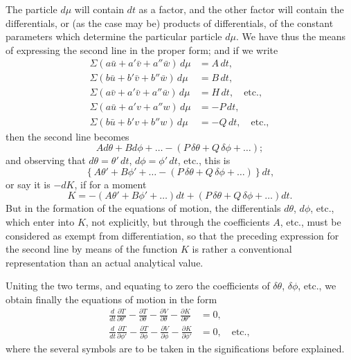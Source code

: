 \documentclass[11pt,a4paper]{book}
\begin{document}
The particle $d\mu$ will contain $dt$ as a factor, and the other factor will contain the differentials, or (as the case may be) products of differentials, of the constant parameters which determine the particular particle $d\mu$. We have thus the means of expressing the second line in the proper form; and if we write
\begin{align*}
\Sigma(a\bar{u}+a'\bar{v}+a''\bar{w})\,d\mu &= A\,dt,\\
\Sigma(b\bar{u}+b'\bar{v}+b''\bar{w})\,d\mu &= B\,dt,\\
\Sigma(a\bar{v}+a'\bar{v}+a''\bar{w})\,d\mu &= H\,dt,\quad \text{etc.},\\
\Sigma(a\bar{u}+a'v+a''w)\,d\mu &= -P\,dt,\\
\Sigma(b\bar{u}+b'v+b''w)\,d\mu &= -Q\,dt,\quad \text{etc.},
\end{align*}
then the second line becomes
\[
Ad\theta+Bd\phi+\ldots
-(P\,\delta\theta+Q\,\delta\phi+\ldots);
\]
and observing that $d\theta=\theta'\,dt$, $d\phi=\phi'\,dt$, etc., this is
\[
\left\{A\theta'+B\phi'+\ldots-(P\,\delta\theta+Q\,\delta\phi+\ldots)\right\}dt,
\]
or say it is $-dK$, if for a moment
\[
K=-(A\theta'+B\phi'+\ldots)dt+(P\,\delta\theta+Q\,\delta\phi+\ldots)dt.
\]
But in the formation of the equations of motion, the differentials $d\theta$, $d\phi$, etc., which enter into $K$, not explicitly, but through the coefficients $A$, etc., must be considered as exempt from differentiation, so that the preceding expression for the second line by means of the function $K$ is rather a conventional representation than an actual analytical value.

Uniting the two terms, and equating to zero the coefficients of $\delta\theta$, $\delta\phi$, etc., we obtain finally the equations of motion in the form
\begin{align}
\frac{d}{dt}\frac{\partial T}{\partial\theta'}-\frac{\partial T}{\partial\theta}-\frac{\partial V}{\partial\theta}-\frac{\partial K}{\partial\theta'} &= 0,\\
\frac{d}{dt}\frac{\partial T}{\partial\phi'}-\frac{\partial T}{\partial\phi}-\frac{\partial V}{\partial\phi}-\frac{\partial K}{\partial\phi'} &= 0,\quad \text{etc.},
\end{align}
where the several symbols are to be taken in the significations before explained.
\end{document}
